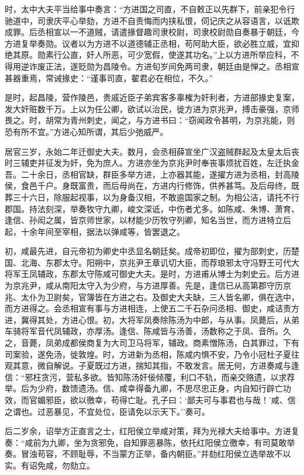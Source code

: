 \documentclass[]{article}
\begin{document}
时，太中大夫平当给事中奏言：``方进国之司直，不自敕正以先群下，前亲犯令行驰道中，司隶庆平心举劾，方进不自责悔而内挟私恨，伺记庆之从容语言，以诋欺成罪。后丞相宣以一不道贼，请遣掾督趣司隶校尉，司隶校尉勋自奏暴于朝廷，今方进复举奏勋。议者以为方进不以道德辅正丞相，苟阿助大臣，欲必胜立威，宜抑绝其原。勋素行公直，奸人所恶，可少宽假，使遂其功名。''上以方进所举应科，不得用逆诈废正法，遂贬勋为昌陵令。方进旬岁间免两司隶，朝廷由是惮之。丞相宣甚器重焉，常诫掾史：``谨事司直，翟君必在相位，不久。''

是时，起昌陵，营作陵邑，贵戚近臣子弟宾客多辜榷为奸利者，方进部掾史复案，发大奸赃数千万。上以为任公卿，欲试以治民，徙方进为京兆尹，搏击豪强，京师畏之。时，胡常为青州刺史，闻之，与方进书曰：``窃闻政令甚明，为京兆能，则恐有所不宜。''方进心知所谓，其后少弛威严。

居官三岁，永始二年迁御史大夫。数月，会丞相薛宣坐广汉盗贼群起及太皇太后丧时三辅吏并征发为奸，免为庶人。方进亦坐为京兆尹时奉丧事烦扰百姓，左迁执金吾。二十余日，丞相官缺，群臣多举方进，上亦器其能，遂擢方进为丞相，封高陵侯，食邑千户。身既富贵，而后母尚在，方进内行修饰，供养甚笃。及后母终，既葬三十六日，除服起视事，以为身备汉相，不敢逾国家之制。为相公洁，请托不行郡国。持法刻深，举奏牧守九卿，峻文深诋，中伤者尤多。如陈咸、朱博、萧育、逢信、孙闳之属，皆京师世家，以材能少历牧守列卿，知名当世，而方进特立后起，十余年间至宰相，据法以弹咸等，皆罢退之。

初，咸最先进，自元帝初为卿史中丞显名朝廷矣。成帝初即位，擢为部刺史，历楚国、北海、东郡太守。阳朔中，京兆尹王章讥切大臣，而荐琅邪太守冯野王可代大将军王凤辅政，东郡太守陈咸可御史大夫。是时，方进甫从博士为刺史云。后方进为京兆尹，咸从南阳太守入为少府，与方进厚善。先是，逢信已从高第郡守历京兆、太仆为卫尉矣，官簿皆在方进之右。及御史大夫缺，三人皆名卿，俱在选中，而方进得之。会丞相宣有事与方进相连，上使五二千石杂问丞相、御史，咸诘责方进，冀得其处，方进心恨。初，大将军凤奏除陈汤为中郎，与从事。凤薨后，从弟车骑将军音代凤辅政，亦厚汤。逢信、陈咸皆与汤善，汤数称之于凤、音所。久之，音薨，凤弟成都侯商复为大司卫马将军，辅政。商素憎陈汤，白其罪过，下有司案验，遂免汤，徙敦煌。时，方进新为丞相，陈咸内惧不安，乃令小冠杜子夏往观其意，微自解说。子夏既过方进，揣知其指，不敢发言。居无何，方进奏咸与逢信：``邪枉贪污，营私多欲。皆知陈汤奸佞倾覆，利口不轨，而亲交赂遗，以求荐举。后为少府，数馈遗汤。信、咸幸得备九卿，不思尽忠正身，内自知行辟亡功效，而官媚邪臣，欲以徼幸，苟得亡耻。孔子曰：`鄙夫可与事君也与哉！'咸、信之谓也。过恶暴见，不宜处位，臣请免以示天下。''奏可。

后二岁余，诏举方正直言之士，红阳侯立举咸对策，拜为光禄大夫给事中。方进复奏：``咸前为九卿，坐为贪邪免，自知罪恶暴陈，依托红阳侯立徼幸，有司莫敢举奏。冒浊苟容，不顾耻辱，不当蒙方正举，备内朝臣。''并劾红阳侯立选举故不以实。有诏免咸，勿劾立。
\end{document}
